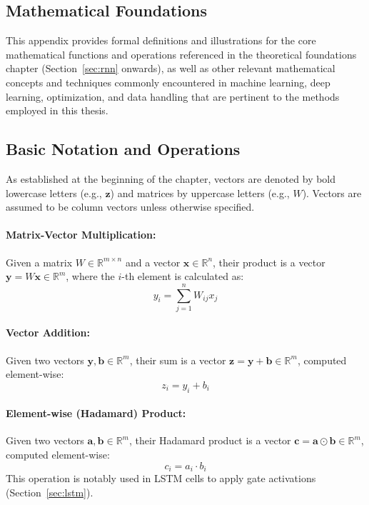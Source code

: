 \begin{appendices}
  \section{Mathematical Foundations}
  \label{app:math_foundations}

  This appendix provides formal definitions and illustrations for the core mathematical functions and operations referenced in the theoretical foundations chapter (Section~\ref{sec:rnn} onwards), as well as other relevant mathematical concepts and techniques commonly encountered in machine learning, deep learning, optimization, and data handling that are pertinent to the methods employed in this thesis. %


  \subsection{Basic Notation and Operations}
  As established at the beginning of the chapter, vectors are denoted by bold lowercase letters (e.g., \( \bm{z} \)) and matrices by uppercase letters (e.g., \( W \)). Vectors are assumed to be column vectors unless otherwise specified.

  \paragraph{Matrix-Vector Multiplication:}
  Given a matrix \( W \in \mathbb{R}^{m \times n} \) and a vector \( \bm{x} \in \mathbb{R}^n \), their product is a vector \( \bm{y} = W\bm{x} \in \mathbb{R}^m \), where the \( i \)-th element is calculated as:
  \begin{equation}
    y_i = \sum_{j=1}^{n} W_{ij} x_j
  \end{equation}

  \paragraph{Vector Addition:}
  Given two vectors \( \bm{y}, \bm{b} \in \mathbb{R}^m \), their sum is a vector \( \bm{z} = \bm{y} + \bm{b} \in \mathbb{R}^m \), computed element-wise:
  \begin{equation}
    z_i = y_i + b_i
  \end{equation}

  \paragraph{Element-wise (Hadamard) Product:}
  Given two vectors \( \bm{a}, \bm{b} \in \mathbb{R}^m \), their Hadamard product is a vector \( \bm{c} = \bm{a} \odot \bm{b} \in \mathbb{R}^m \), computed element-wise:
  \begin{equation}
    c_i = a_i \cdot b_i
  \end{equation}
  This operation is notably used in LSTM cells to apply gate activations (Section~\ref{sec:lstm}).


\end{appendices}
